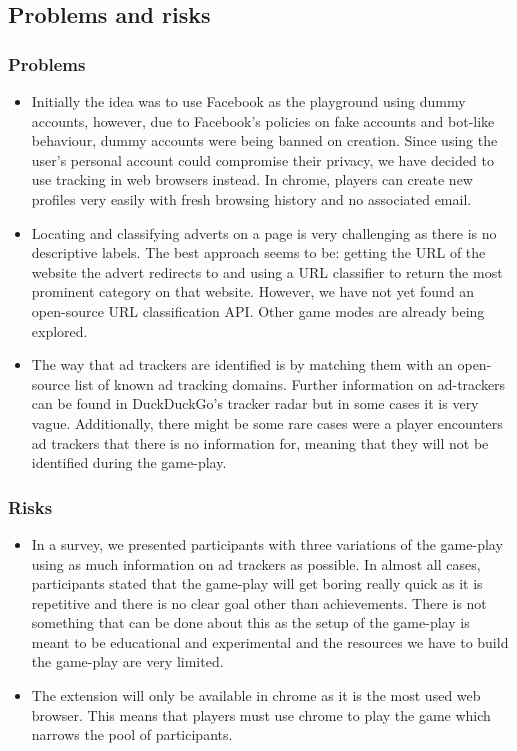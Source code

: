 \documentclass[11pt]{article}
\begin{document}
\subsection{Problems and risks}\label{problems-and-risks}

\subsubsection{Problems}\label{problems}

\begin{itemize}
\item  Initially the idea was to use Facebook as the playground using dummy accounts, however, due to Facebook's policies on fake accounts and bot-like behaviour, dummy accounts were being banned on creation. Since using the user's personal account could compromise their privacy, we have decided to use tracking in web browsers instead. In chrome, players can create new profiles very easily with fresh browsing history and no associated email.
\item  Locating and classifying adverts on a page is very challenging as there is no descriptive labels. The best approach seems to be: getting the URL of the website the advert redirects to and using a URL classifier to return the most prominent category on that website. However, we have not yet found an open-source URL classification API. Other game modes are already being explored.
\item  The way that ad trackers are identified is by matching them with an open-source list of known ad tracking domains. Further information on ad-trackers can be found in DuckDuckGo's tracker radar but in some cases it is very vague. Additionally, there might be some rare cases were a player encounters ad trackers that there is no information for, meaning that they will not be identified during the game-play.
\end{itemize}

\subsubsection{Risks}\label{risks}

\begin{itemize}
\item  In a survey, we presented participants with three variations of the game-play using as much information on ad trackers as possible. In almost all cases, participants stated that the game-play will get boring really quick as it is repetitive and there is no clear goal other than achievements. There is not something that can be done about this as the setup of the game-play is meant to be educational and experimental and the resources we have to build the game-play are very limited.
\item  The extension will only be available in chrome as it is the most used web browser. This means that players must use chrome to play the game which narrows the pool of participants.

\end{itemize}
\end{document}
